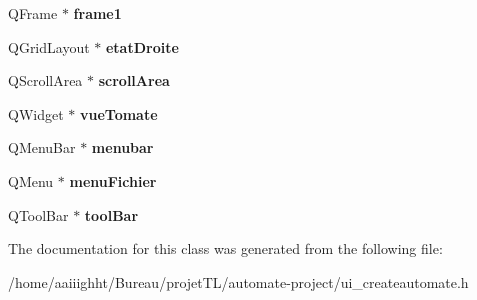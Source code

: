 \begin{DoxyCompactItemize}
\item 
\hypertarget{class_ui___create_automate_a28cdd63c65123e5d3e2095f3d70d8eb1}{Q\-Frame $\ast$ {\bfseries frame1}}\label{class_ui___create_automate_a28cdd63c65123e5d3e2095f3d70d8eb1}

\item 
\hypertarget{class_ui___create_automate_ab3760cfcd0a10d084cc92e68f5564d99}{Q\-Grid\-Layout $\ast$ {\bfseries etat\-Droite}}\label{class_ui___create_automate_ab3760cfcd0a10d084cc92e68f5564d99}

\item 
\hypertarget{class_ui___create_automate_a0203f6debfdb967cc169b54d37d22ec5}{Q\-Scroll\-Area $\ast$ {\bfseries scroll\-Area}}\label{class_ui___create_automate_a0203f6debfdb967cc169b54d37d22ec5}

\item 
\hypertarget{class_ui___create_automate_ae94daa69c1dfb3a6c82113184de6df5a}{Q\-Widget $\ast$ {\bfseries vue\-Tomate}}\label{class_ui___create_automate_ae94daa69c1dfb3a6c82113184de6df5a}

\item 
\hypertarget{class_ui___create_automate_ac8f7e16409959325bd6d59a14efe5f42}{Q\-Menu\-Bar $\ast$ {\bfseries menubar}}\label{class_ui___create_automate_ac8f7e16409959325bd6d59a14efe5f42}

\item 
\hypertarget{class_ui___create_automate_a2c3543c53916780358977343645f1666}{Q\-Menu $\ast$ {\bfseries menu\-Fichier}}\label{class_ui___create_automate_a2c3543c53916780358977343645f1666}

\item 
\hypertarget{class_ui___create_automate_a59803facce9d03b559163f4acbf31a11}{Q\-Tool\-Bar $\ast$ {\bfseries tool\-Bar}}\label{class_ui___create_automate_a59803facce9d03b559163f4acbf31a11}

\end{DoxyCompactItemize}


The documentation for this class was generated from the following file\-:\begin{DoxyCompactItemize}
\item 
/home/aaiiighht/\-Bureau/projet\-T\-L/automate-\/project/ui\-\_\-createautomate.\-h\end{DoxyCompactItemize}

